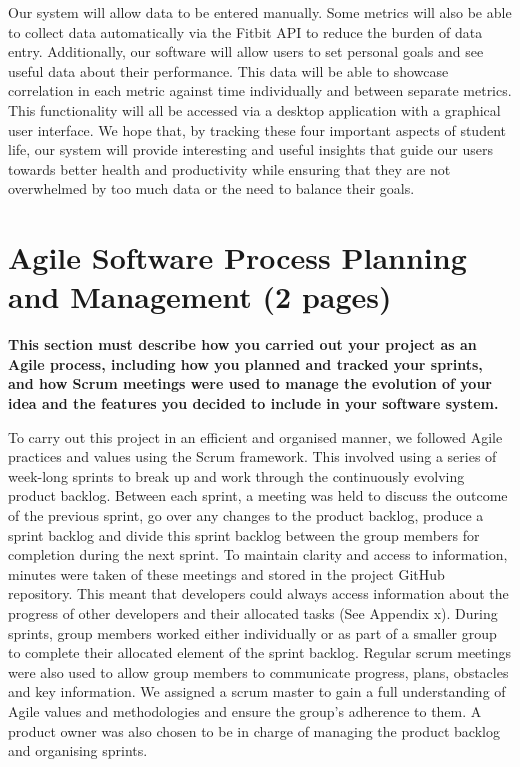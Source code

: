 \documentclass[12pt]{article}
\begin{document}
Our system will allow data to be entered manually. Some metrics will also be able to collect data automatically via the Fitbit API to reduce the burden of data entry. Additionally, our software will allow users to set personal goals and see useful data about their performance. This data will be able to showcase correlation in each metric against time individually and between separate metrics. This functionality will all be accessed via a desktop application with a graphical user interface. We hope that, by tracking these four important aspects of student life, our system will provide interesting and useful insights that guide our users towards better health and productivity while ensuring that they are not overwhelmed by too much data or the need to balance their goals.


\section{Agile Software Process Planning and Management (2 pages)}
\textbf{This section must describe how you carried out your project as an Agile process, including
how you planned and tracked your sprints, and how Scrum meetings were used to manage
the evolution of your idea and the features you decided to include in your software system.}\par
To carry out this project in an efficient and organised manner, we followed Agile practices and values using the Scrum framework. This involved using a series of week-long sprints to break up and work through the continuously evolving product backlog. Between each sprint, a meeting was held to discuss the outcome of the previous sprint, go over any changes to the product backlog, produce a sprint backlog and divide this sprint backlog between the group members for completion during the next sprint. To maintain clarity and access to information, minutes were taken of these meetings and stored in the project GitHub repository. This meant that developers could always access information about the progress of other developers and their allocated tasks (See Appendix x). During sprints, group members worked either individually or as part of a smaller group to complete their allocated element of the sprint backlog. Regular scrum meetings were also used to allow group members to communicate progress, plans, obstacles and key information. We assigned a scrum master to gain a full understanding of Agile values and methodologies and ensure the group's adherence to them. A product owner was also chosen to be in charge of managing the product backlog and organising sprints.\par
\end{document}
